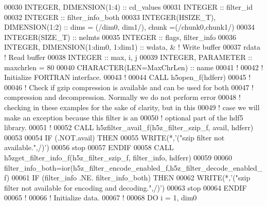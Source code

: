 \begin{DoxyCode}
00030   \textcolor{keywordtype}{INTEGER}, \textcolor{keywordtype}{DIMENSION(1:4)} :: cd\_values
00031   \textcolor{keywordtype}{INTEGER} :: filter\_id
00032   \textcolor{keywordtype}{INTEGER} :: filter\_info\_both
00033   \textcolor{keywordtype}{INTEGER(HSIZE\_T)}, \textcolor{keywordtype}{DIMENSION(1:2)} :: dims = (/dim0, dim1/), chunk =(/chunk0,chunk1/)
00034   \textcolor{keywordtype}{INTEGER(SIZE\_T)} :: nelmts
00035   \textcolor{keywordtype}{INTEGER} :: flags, filter\_info
00036   \textcolor{keywordtype}{INTEGER}, \textcolor{keywordtype}{DIMENSION(1:dim0, 1:dim1)} :: wdata, & \textcolor{comment}{! Write buffer }
00037                                         rdata    \textcolor{comment}{! Read buffer}
00038   \textcolor{keywordtype}{INTEGER} :: max, i, j
00039   \textcolor{keywordtype}{INTEGER}, \textcolor{keywordtype}{PARAMETER} :: maxchrlen = 80
00040   \textcolor{keywordtype}{CHARACTER(LEN=MaxChrLen)} :: name
00041   \textcolor{comment}{!}
00042   \textcolor{comment}{! Initialize FORTRAN interface.}
00043   \textcolor{comment}{!}
00044   \textcolor{keyword}{CALL }h5open\_f(hdferr)
00045   \textcolor{comment}{! }
00046   \textcolor{comment}{!  Check if gzip compression is available and can be used for both}
00047   \textcolor{comment}{!  compression and decompression.  Normally we do not perform error}
00048   \textcolor{comment}{!  checking in these examples for the sake of clarity, but in this}
00049   \textcolor{comment}{!  case we will make an exception because this filter is an}
00050   \textcolor{comment}{!  optional part of the hdf5 library.}
00051   \textcolor{comment}{!  }
00052   \textcolor{keyword}{CALL }h5zfilter\_avail\_f(h5z\_filter\_szip\_f, avail, hdferr)
00053 
00054   \textcolor{keywordflow}{IF} (.NOT.avail) \textcolor{keywordflow}{THEN}
00055      \textcolor{keyword}{WRITE}(*,\textcolor{stringliteral}{'("szip filter not available.",/)'})
00056      stop
00057 \textcolor{keywordflow}{  ENDIF}
00058   \textcolor{keyword}{CALL }h5zget\_filter\_info\_f(h5z\_filter\_szip\_f, filter\_info, hdferr)
00059 
00060   filter\_info\_both=ior(h5z\_filter\_encode\_enabled\_f,h5z\_filter\_decode\_enabled\_f)
00061   \textcolor{keywordflow}{IF} (filter\_info .NE. filter\_info\_both) \textcolor{keywordflow}{THEN}
00062      \textcolor{keyword}{WRITE}(*,\textcolor{stringliteral}{'("szip filter not available for encoding and decoding.",/)'})
00063      stop
00064 \textcolor{keywordflow}{  ENDIF}
00065   \textcolor{comment}{!}
00066   \textcolor{comment}{! Initialize data.}
00067   \textcolor{comment}{!}
00068   \textcolor{keywordflow}{DO} i = 1, dim0

\end{DoxyCode}
